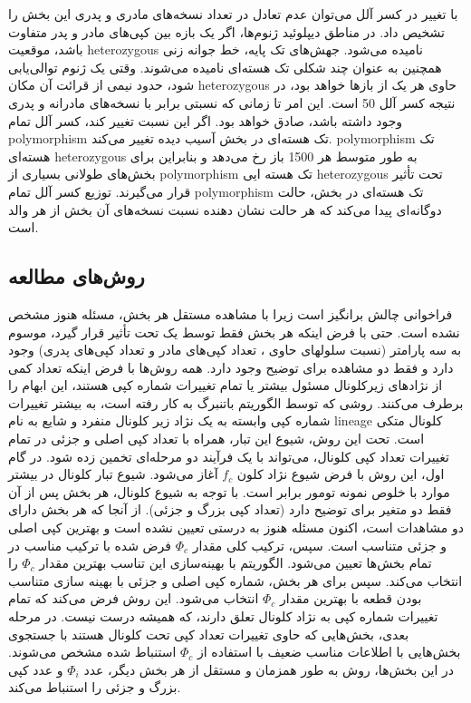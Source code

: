 با تغییر در کسر آلل می‌توان عدم تعادل در تعداد نسخه‌های مادری و پدری این بخش را تشخیص داد. در مناطق دیپلوئید ژنوم‌ها، اگر یک بازه بین کپی‌های مادر و پدر متفاوت باشد، موقعیت \gls{heterozygous} نامیده می‌شود. جهش‌های تک پایه، خط جوانه زنی همچنین به عنوان چند شکلی تک هسته‌ای نامیده می‌شوند. وقتی یک ژنوم توالی‌یابی شود، حدود نیمی از قرائت آن مکان \gls{heterozygous} حاوی هر یک از بازها خواهد بود، در نتیجه کسر آلل 50 است. این امر تا زمانی که نسبتی برابر با نسخه‌های مادرانه و پدری وجود داشته باشد، صادق خواهد بود. اگر این نسبت تغییر کند، کسر آلل  تمام \gls{polymorphism} تک هسته‌ای در بخش آسیب دیده تغییر می‌کند. \gls{polymorphism} تک هسته‌ای \gls{heterozygous} به طور متوسط هر 1500 باز \cite{chen2012personal} رخ می‌دهد و بنابراین برای بخش‌های طولانی بسیاری از \gls{polymorphism} تک هسته ایی \gls{heterozygous} تحت تأثیر قرار می‌گیرند. توزیع کسر آلل  تمام \gls{polymorphism} تک هسته‌ای در بخش، حالت دوگانه‌ای پیدا می‌کند که هر حالت نشان دهنده نسبت نسخه‌های آن بخش از هر والد است.

\subsection{روش‌های مطالعه}

فراخوانی  چالش برانگیز است زیرا با مشاهده مستقل هر بخش، مسئله هنوز مشخص نشده است. حتی با فرض اینکه هر بخش فقط توسط یک  تحت تأثیر قرار گیرد،  موسوم به سه پارامتر (نسبت سلولهای حاوی ، تعداد کپی‌های مادر و تعداد کپی‌های پدری) وجود دارد و فقط دو مشاهده برای توضیح وجود دارد.
همه روش‌ها با فرض اینکه تعداد کمی از نژادهای زیرکلونال مسئول بیشتر یا تمام تغییرات شماره کپی هستند، این ابهام را برطرف می‌کنند. روشی که توسط الگوریتم باتنبرگ \cite{nik2012life} به کار رفته است، به بیشتر تغییرات شماره کپی وابسته به یک نژاد زیر کلونال منفرد و شایع به نام \gls{lineage} کلونال متکی است. تحت این روش، شیوع این تبار، همراه با تعداد کپی اصلی و جزئی در تمام تغییرات تعداد کپی کلونال، می‌تواند با یک فرآیند دو مرحله‌ای تخمین زده شود. در گام اول، این روش با فرض شیوع نژاد کلون $f_c$  آغاز می‌شود. شیوع تبار کلونال در بیشتر موارد با خلوص نمونه تومور برابر است. با توجه به شیوع کلونال، هر بخش پس از آن فقط دو متغیر برای توضیح دارد (تعداد کپی بزرگ و جزئی). از آنجا که هر بخش دارای دو مشاهدات است، اکنون مسئله هنوز به درستی تعیین نشده است و بهترین کپی اصلی و جزئی متناسب است. سپس، ترکیب کلی مقدار $\Phi_c$  فرض شده با ترکیب مناسب در تمام بخش‌ها تعیین می‌شود. الگوریتم با بهینه‌سازی این تناسب بهترین مقدار $\Phi_c$  را انتخاب می‌کند. سپس برای هر بخش، شماره کپی اصلی و جزئی با بهینه سازی متناسب بودن قطعه با بهترین مقدار $\Phi_c$   انتخاب می‌شود. این روش فرض می‌کند که تمام تغییرات شماره کپی به نژاد کلونال تعلق دارند، که همیشه درست نیست. در مرحله بعدی، بخش‌هایی که حاوی تغییرات تعداد کپی تحت کلونال هستند با جستجوی بخش‌هایی با اطلاعات مناسب ضعیف با استفاده از $\Phi_c$   استنباط شده مشخص می‌شوند. در این بخش‌ها، روش به طور همزمان و مستقل از هر بخش دیگر، عدد $\Phi_i$ و عدد کپی بزرگ و جزئی را استنباط می‌کند.


